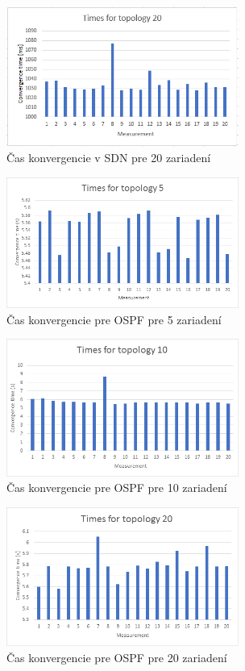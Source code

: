 \documentclass[conference]{IEEEtran}
\begin{document}
\begin{figure}[h!]
\centering
\includegraphics[width=3in]{../img/graph20}
\caption{Čas konvergencie v SDN pre 20 zariadení}
\end{figure}

\begin{figure}[h!]
\centering
\includegraphics[width=3in]{../img/graph5ospf}
\caption{Čas konvergencie pre OSPF pre 5 zariadení}
\end{figure}

\begin{figure}[h!]
\centering
\includegraphics[width=3in]{../img/graph10ospf}
\caption{Čas konvergencie pre OSPF pre 10 zariadení}
\end{figure}

\begin{figure}[h!]
\centering
\includegraphics[width=3in]{../img/graph20ospf}
\caption{Čas konvergencie pre OSPF pre 20 zariadení}
\end{figure}
\end{document}
